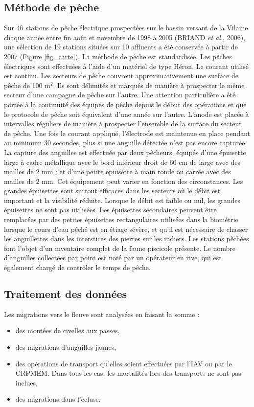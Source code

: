 \documentclass[10pt,twocolumn,titlepage,twoside]{article}\usepackage[]{graphicx}\usepackage[]{xcolor}
\begin{document}
\subsection{Méthode de pêche}
%
Sur 46 stations de pêche électrique
prospectées sur le bassin versant de la Vilaine chaque année entre
fin août et novembre de 1998 à 2005
(BRIAND \textit{ et
al.}, 2006), une sélection de 19 stations
situées sur 10 affluents a été conservée à partir de 2007
(Figure \ref{fig_carte}). La
méthode de pêche est standardisée. Les pêches électriques
sont effectuées à l'aide d'un
matériel de type Héron. Le courant utilisé est continu. Les secteurs de pêche
couvrent approximativement une surface de pêche de 100 m$^2$.
Ils sont délimités et marqués de manière à prospecter le
même secteur d'une campagne de pêche sur
l'autre. Une attention particulière a été portée à la continuité des
équipes de pêche depuis le début des opérations et que le protocole de pêche
soit équivalent d'une année sur l'autre.
L'anode est placée à intervalles réguliers de
manière à prospecter l'ensemble de la surface du
secteur de pêche. Une fois le courant appliqué,
l'électrode est maintenue en place pendant au minimum
30 secondes, plus si une anguille détectée n'est
pas encore capturée. La capture des anguilles est effectuée par
deux pêcheurs, équipés d'une épuisette large
à cadre métallique avec le bord inférieur droit de 60 cm de large
avec des mailles de 2 mm ; et d'une petite épuisette
à main ronde ou carrée avec des mailles de 2 mm. Cet équipement
peut varier en fonction des circonstances. Les grandes épuisettes
sont surtout efficaces dans les secteurs où le débit est important
et la visibilité réduite. Lorsque le débit est faible ou nul, les
grandes épuisettes ne sont pas utilisées. Les épuisettes
secondaires peuvent être remplacées par des petites épuisettes
rectangulaires utilisées dans la biométrie lorsque le cours
d'eau pêché est en étiage sévère, et
qu'il est nécessaire de
 \og chasser \fg les anguillettes dans les
interstices des pierres sur les radiers. Les stations pêchées font
l'objet d'un inventaire complet de la
faune piscicole présente. Le nombre d'anguilles
collectées par point est noté par un opérateur en rive, qui est
également chargé de contrôler le temps de pêche.
%
\subsection{Traitement des données}
Les migrations vers le fleuve sont analysées en faisant la somme :
\begin{itemize}
\item des montées de civelles aux passes,
\item des migrations d'anguilles jaunes,
\item des opérations de transport qu'elles soient effectuées par l'IAV ou par le
CRPMEM. Dans tous les cas, les mortalités lors des transports ne sont pas
inclues,
\item des migrations dans l'écluse.
\end{itemize}
\end{document}

